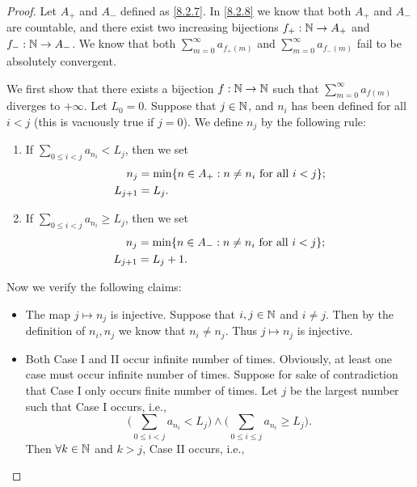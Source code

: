 \begin{proof}
  Let \(A_+\) and \(A_-\) defined as \cref{8.2.7}.
  In \cref{8.2.8} we know that both \(A_+\) and \(A_-\) are countable, and there exist two increasing bijections \(f_+ : \mathbb{N} \to A_+\) and \(f_- : \mathbb{N} \to A_-\).
  We know that both \(\sum_{m = 0}^\infty a_{f_+(m)}\) and \(\sum_{m = 0}^\infty a_{f_-(m)}\) fail to be absolutely convergent.

  We first show that there exists a bijection \(f : \mathbb{N} \to \mathbb{N}\) such that \(\sum_{m = 0}^\infty a_{f(m)}\) diverges to \(+\infty\).
  Let \(L_0 = 0\).
  Suppose that \(j \in \mathbb{N}\), and \(n_i\) has been defined for all \(i < j\)
  (this is vacuously true if \(j = 0\)).
  We define \(n_j\) by the following rule:
  \begin{enumerate}[label=(\Roman*)]
    \item If \(\sum_{0 \leq i < j} a_{n_i} < L_j\), then we set
          \begin{align*}
            n_j       & = \min\set{n \in A_+ : n \neq n_i \text{ for all } i < j}; \\
            L_{j + 1} & = L_j.
          \end{align*}
    \item If \(\sum_{0 \leq i < j} a_{n_i} \geq L_j\), then we set
          \begin{align*}
            n_j       & = \min\set{n \in A_- : n \neq n_i \text{ for all } i < j}; \\
            L_{j + 1} & = L_j + 1.
          \end{align*}
  \end{enumerate}
  Now we verify the following claims:
  \begin{itemize}
    \item The map \(j \mapsto n_j\) is injective.
          Suppose that \(i, j \in \mathbb{N}\) and \(i \neq j\).
          Then by the definition of \(n_i, n_j\) we know that \(n_i \neq n_j\).
          Thus \(j \mapsto n_j\) is injective.
    \item Both Case I and II occur infinite number of times.
          Obviously, at least one case must occur infinite number of times.
          Suppose for sake of contradiction that Case I only occurs finite number of times.
          Let \(j\) be the largest number such that Case I occurs, i.e.,
          \[
            \Bigg(\sum_{0 \leq i < j} a_{n_i} < L_j\Bigg) \land \Bigg(\sum_{0 \leq i \leq j} a_{n_i} \geq L_j\Bigg).
          \]
          Then \(\forall k \in \mathbb{N}\) and \(k > j\), Case II occurs, i.e.,
          \[
\]
\end{itemize}
\end{proof}
